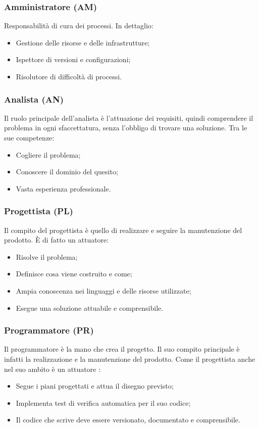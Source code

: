 \documentclass[12pt,a4paper,titlepage]{article}
\begin{document}
\subsubsection{Amministratore (AM)} 
Responsabilità di cura dei processi. In dettaglio: 
\begin{itemize}
	\item Gestione delle risorse e delle infrastrutture;
	\item Ispettore di versioni e configurazioni;
	\item Risolutore di difficoltà di processi.
\end{itemize}
\subsubsection{Analista (AN)} 
Il ruolo principale dell'analista è l'attuazione dei requisiti, quindi comprendere il problema in ogni sfaccettatura, senza l'obbligo di trovare una soluzione. Tra le sue competenze: 
\begin{itemize}
	\item Cogliere il problema;
	\item Conoscere il dominio del quesito;
	\item Vasta esperienza professionale.
\end{itemize}
\subsubsection{Progettista (PL)} 
Il compito del progettista è quello di realizzare e seguire la manutenzione del prodotto. È di fatto un attuatore: 
\begin{itemize}
	\item Risolve il problema;
	\item Definisce cosa viene costruito e come;
	\item Ampia conoscenza nei linguaggi e delle risorse utilizzate;
	\item Esegue una soluzione attuabile e comprensibile.
\end{itemize}
\subsubsection{Programmatore (PR)} 
Il programmatore è la mano che crea il progetto. Il suo compito principale è infatti la realizzazione e la manutenzione del prodotto. Come il progettista anche nel suo ambito è un attuatore :
\begin{itemize}
	\item Segue i piani progettati e attua il disegno previsto;
	\item Implementa test di verifica automatica per il suo codice;
	\item Il codice che scrive deve essere versionato, documentato e comprensibile.
\end{itemize}
\end{document}

